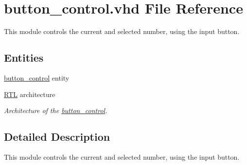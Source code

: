 \hypertarget{button__control_8vhd}{\section{button\-\_\-control.\-vhd File Reference}
\label{button__control_8vhd}
}


This module controls the current and selected number, using the input button.  


\subsection*{Entities}
\begin{DoxyCompactItemize}
\item 
\hyperlink{classbutton__control}{button\-\_\-control} entity
\item 
\hyperlink{classbutton__control_1_1RTL}{R\-T\-L} architecture
\begin{DoxyCompactList}\small\item\em Architecture of the \hyperlink{classbutton__control}{button\-\_\-control}. \end{DoxyCompactList}\end{DoxyCompactItemize}


\subsection{Detailed Description}
This module controls the current and selected number, using the input button. 